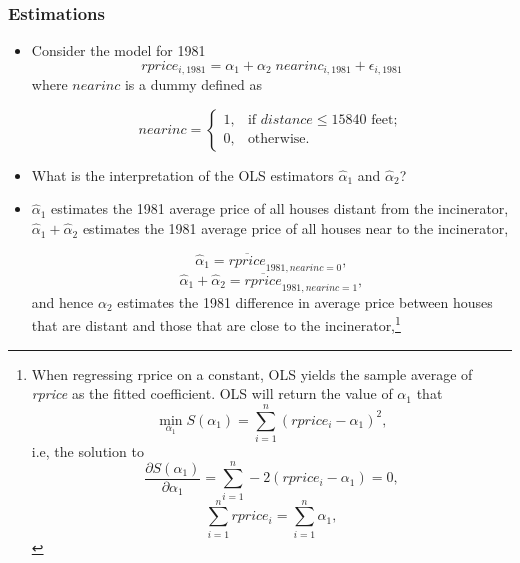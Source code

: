 \documentclass[landscape,letterpaper,9pt]{article}
\begin{document}
\subsubsection{Estimations}
\begin{itemize}
    \item Consider the model for 1981
\[ rprice_{i,1981} = \alpha_1 + \alpha_2 \;  nearinc_{i,1981} + \epsilon_{i,1981} \]
where \(nearinc\) is a dummy defined as

\[
nearinc =
\begin{cases}
    1, &\text{if $distance \leq 15840$ feet}; \\
    0, &\text{otherwise}.
\end{cases}
\]

\item What is the interpretation of the OLS estimators \(\widehat{\alpha}_1\) and \(\widehat{\alpha}_2\)?
\item
\(\widehat{\alpha}_1\) estimates the 1981 average price of all houses distant from the incinerator,
\(\widehat{\alpha}_1 + \widehat{\alpha}_2\) estimates the 1981 average price of all houses near to the incinerator,

\[\widehat{\alpha}_1 = \overline{rprice}_{1981,nearinc=0},\]
\[\widehat{\alpha}_1 + \widehat{\alpha}_2 = \overline{rprice}_{1981,nearinc=1},\]
and hence \(\alpha_2\) estimates the 1981 difference in average price between  houses that
are distant and those that are close to the incinerator,\footnote{When regressing rprice on a constant,
OLS yields the sample average of \textit{rprice} as the fitted coefficient. OLS will
return the value of \(\alpha_1\) that
\[
\min_{\alpha_1} S( \alpha_1) = \sum_{i=1}^n (rprice_i - \alpha_1)^2,
\]
i.e, the solution to
\[
\frac{\partial S(\alpha_1) }{\partial \alpha_1} = \sum_{i=1}^n  - 2 (rprice_i - \alpha_1)=0,
\]
\[
 \sum_{i=1}^n  rprice_i  =  \sum_{i=1}^n  \alpha_1,
\]

}
\end{itemize}
\end{document}
